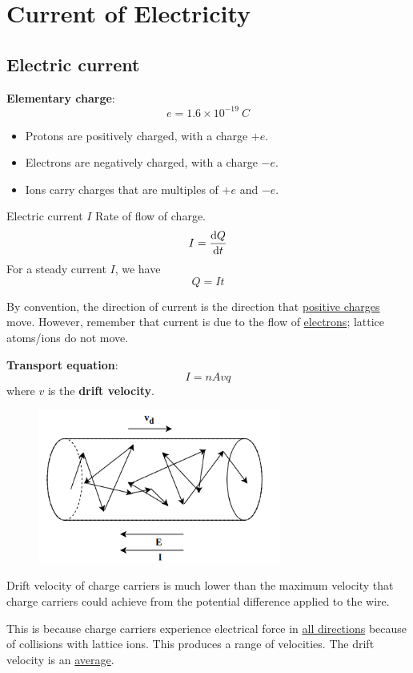\section{Current of Electricity}
\subsection{Electric current}
\textbf{Elementary charge}:
\[ e = 1.6 \times 10^{-19}\:\unit{C} \]
\begin{itemize}
\item Protons are positively charged, with a charge $+e$.
\item Electrons are negatively charged, with a charge $-e$. 
\item Ions carry charges that are multiples of $+e$ and $-e$.
\end{itemize}

\begin{defn}{Electric current $I$}{}
Rate of flow of charge.
\[ I=\odv{Q}{t} \]
For a steady current $I$, we have 
\begin{equation}
Q = It
\end{equation}
\end{defn}

\begin{remark}
By convention, the direction of current is the direction that \underline{positive charges} move. However, remember that current is due to the flow of \underline{electrons}; lattice atoms/ions do not move.
\end{remark}

\textbf{Transport equation}:
\begin{equation}
I=nAvq
\end{equation}
where $v$ is the \textbf{drift velocity}.

\begin{figure}[H]
    \centering
    \includegraphics[width=8cm]{images/transport_eqn.png}
\end{figure}

\begin{remark}
Drift velocity of charge carriers is much lower than the maximum velocity that charge carriers could achieve from the potential difference applied to the wire.

This is because charge carriers experience electrical force in \underline{all directions} because of collisions with lattice ions. This produces a range of velocities. The drift velocity is an \underline{average}.
\end{remark}

